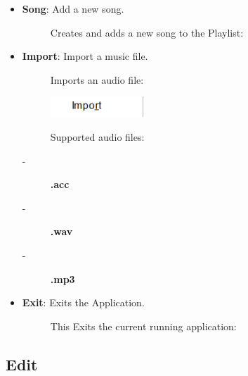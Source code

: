 \documentclass{article}
\begin{document}
\begin{itemize}
\begin{description}
    \end{description}
        \item \textbf{Song}: Add a new song.
    \begin{description}
        \item[] Creates and adds a new song to the Playlist:
    \end{description}
    \item \textbf{Import}: Import a music file.
    \begin{description}
        \item[] Imports an audio file:
        \item[] \includegraphics[width=3.5cm]{Images/File Import.png}
        \item[]Supported audio files: 
        \item[-]\textbf{.acc}
        \item[-]\textbf{.wav}
        \item[-]\textbf{.mp3}
    \end{description}
        \item \textbf{Exit}: Exits the Application.
    \begin{description}
        \item[] This Exits the current running application:
    \end{description}
\end{itemize}

\subsection{Edit}
\end{document}
